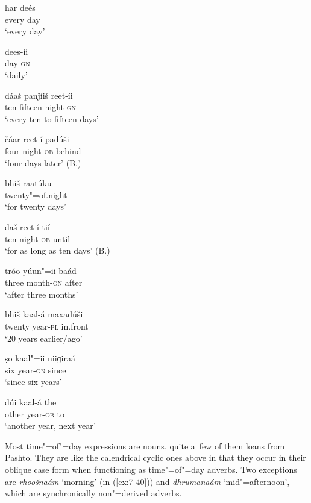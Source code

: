 \begin{exe}
\ex
\label{ex:7-30}
\gll har deés  \\
every day \\
\glt `every day' 

\ex
\label{ex:7-31}
\gll dees-íi \\
day-\textsc{gn} \\
\glt `daily' 

\ex
\label{ex:7-32}
\gll dáaš panǰíiš reet-íi \\
ten fifteen night-\textsc{gn} \\
\glt `every ten to fifteen days'

\ex
\label{ex:7-33}
\gll čáar reet-í padúši \\
four night-\textsc{ob} behind  \\
\glt `four days later' (B.)

\ex
\label{ex:7-34}
\gll bhiš-raatúku\\
twenty"=of.night    \\
\glt `for twenty days'

\ex
\label{ex:7-35}
\gll daš reet-í tií \\
ten night-\textsc{ob} until  \\
\glt `for as long as ten days' (B.)

\ex
\label{ex:7-36}
\gll tróo yúun"=ii baád \\
three month-\textsc{gn} after \\
\glt `after three months'

\ex
\label{ex:7-37}
\gll bhiš kaal-á maxadúši \\
twenty year-\textsc{pl} in.front  \\
\glt `20 years earlier/ago'

\ex
\label{ex:7-38}
\gll ṣo kaal"=ii niiɡiraá \\
six year-\textsc{gn} since  \\
\glt `since six years'

\ex
\label{ex:7-39}
\gll dúi kaal-á the \\
other year-\textsc{ob} to \\
\glt `another year, next year'
\end{exe}

Most time"=of"=day expressions are nouns, quite a~few of them loans from Pashto. They are like the
calendrical cyclic ones above in that they occur in their oblique case form when functioning as
time"=of"=day adverbs. Two exceptions are \textit{rhoošnaám} `morning' (in (\ref{ex:7-40})) and
\textit{dhrumanaám} `mid"=afternoon', which are synchronically non"=derived adverbs.

